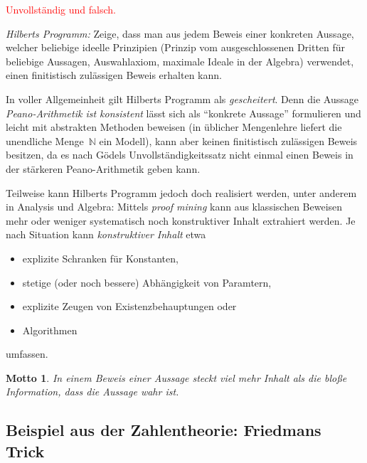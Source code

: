 \documentclass[a4paper,ngerman,12pt]{scrartcl}
\theoremstyle{definition}
\theoremstyle{plain}
\newtheorem{motto}[defn]{Motto}
\theoremstyle{remark}
\newcommand{\NN}{\mathbb{N}}
\renewcommand{\_}{\mathpunct{.}\,}
\newcommand{\?}{\,{:}\,}
\newcommand{\XXX}[1]{\textcolor{red}{#1}}
\begin{document}
\XXX{Unvollständig und falsch.}

\emph{Hilberts Programm:} Zeige, dass man aus jedem Beweis einer konkreten
Aussage, welcher beliebige ideelle Prinzipien (Prinzip vom ausgeschlossenen
Dritten für beliebige Aussagen, Auswahlaxiom, maximale Ideale in der Algebra)
verwendet, einen finitistisch zulässigen Beweis erhalten kann.

In voller Allgemeinheit gilt Hilberts Programm als \emph{gescheitert}. Denn die
Aussage \emph{Peano-Arithmetik ist konsistent} lässt sich als "`konkrete
Aussage"' formulieren und leicht mit abstrakten Methoden beweisen (in üblicher
Mengenlehre liefert die unendliche Menge~$\NN$ ein Modell), kann aber keinen
finitistisch zulässigen Beweis besitzen, da es nach Gödels
Unvollständigkeitssatz nicht einmal einen Beweis in der stärkeren
Peano-Arithmetik geben kann.

Teilweise kann Hilberts Programm jedoch doch realisiert werden, unter anderem
in Analysis und Algebra: Mittels \emph{proof mining} kann aus klassischen
Beweisen mehr oder weniger systematisch noch konstruktiver Inhalt extrahiert
werden. Je nach Situation kann \emph{konstruktiver Inhalt} etwa
\begin{itemize}
\item explizite Schranken für Konstanten,
\item stetige (oder noch bessere) Abhängigkeit von Paramtern,
\item explizite Zeugen von Existenzbehauptungen oder
\item Algorithmen
\end{itemize}
umfassen.


\begin{motto}\label{motto:inhaltvonbeweisen}In einem \emph{Beweis} einer
Aussage steckt viel mehr Inhalt als die bloße Information, dass die Aussage
wahr ist.\end{motto}


\subsection{Beispiel aus der Zahlentheorie: Friedmans Trick}
\end{document}
